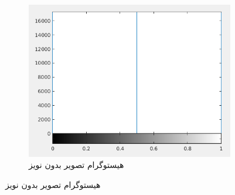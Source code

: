 \documentclass[11.5pt,a4paper]{article}
\begin{document}
\begin{figure}[h]
\begin{subfigure}{0.3\textwidth}
	\includegraphics[scale=0.3]{Imgs/MRF_S0_Hist.png}
	\caption{هیستوگرام تصویر بدون نویز}
	\end{subfigure}	


\end{figure}
\end{document}
